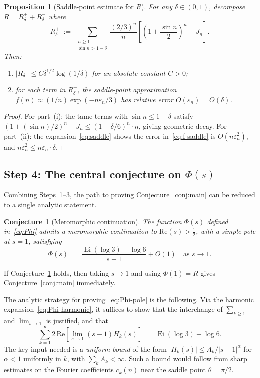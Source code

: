 \documentclass[12pt]{amsart}
\newtheorem{proposition}[theorem]{Proposition}
\newtheorem{conjecture}[theorem]{Conjecture}
\DeclareMathOperator{\Ei}{Ei}
\begin{document}
\begin{proposition}[Saddle-point estimate for $R$]\label{prop:saddle}
For any $\delta\in(0,1)$, decompose $R=R_\delta^{+}+R_\delta^{-}$
where
\[
  R_\delta^{+} \;:=\;
  \sum_{\substack{n\ge 1\\ \sin n>1-\delta}}
  \frac{(2/3)^n}{n}\!\left[\left(1+\frac{\sin n}{2}\right)^{\!n}-J_n\right].
\]
Then:
\begin{enumerate}[label=(\roman*)]
\item $|R_\delta^{-}|\le C\delta^{1/2}\log(1/\delta)$ for an absolute
  constant $C>0$;
\item for each term in $R_\delta^{+}$, the saddle-point approximation
  $f(n)\approx (1/n)\exp(-n\varepsilon_n/3)$ has relative error
  $O(\varepsilon_n)=O(\delta)$.
\end{enumerate}
\end{proposition}

\begin{proof}
For part~(i): the tame terms with $\sin n\le 1-\delta$ satisfy
$(1+(\sin n)/2)^n-J_n\le (1-\delta/6)^n\cdot n$, giving geometric
decay.  For part~(ii): the expansion~\eqref{eq:saddle} shows the
error in~\eqref{eq:f-saddle} is $O(n\varepsilon_n^2)$,
and $n\varepsilon_n^2\le n\varepsilon_n\cdot\delta$.
\end{proof}

\subsection{Step 4: The central conjecture on $\Phi(s)$}

Combining Steps~1--3, the path to proving Conjecture~\ref{conj:main}
can be reduced to a single analytic statement.

\begin{conjecture}[Meromorphic continuation]\label{conj:meromorphic}
The function $\Phi(s)$ defined in~\eqref{eq:Phi} admits a
meromorphic continuation to $\mathrm{Re}(s)>\tfrac{1}{2}$, with a
simple pole at $s=1$, satisfying
\begin{equation}\label{eq:Phi-pole}
  \Phi(s) \;=\; \frac{\Ei(\log 3)-\log 6}{s-1}
               + O(1) \quad\text{as } s\to 1.
\end{equation}
\end{conjecture}

\noindent
If Conjecture~\ref{conj:meromorphic} holds, then taking $s\to 1$
and using $\Phi(1)=R$ gives Conjecture~\ref{conj:main} immediately.

The analytic strategy for proving~\eqref{eq:Phi-pole} is the following.
Via the harmonic expansion~\eqref{eq:Phi-harmonic}, it suffices to show
that the interchange of $\sum_{k\ge 1}$ and $\lim_{s\to 1}$ is
justified, and that
\begin{equation}\label{eq:residue-sum}
  \sum_{k=1}^{\infty} 2\,\mathrm{Re}\!\left[
  \lim_{s\to 1}(s-1)H_k(s)\right]
  \;=\; \Ei(\log 3)-\log 6.
\end{equation}
The key input needed is a \emph{uniform bound} of the form
$|H_k(s)|\le A_k/|s-1|^{\alpha}$ for $\alpha<1$ uniformly in
$k$, with $\sum_k A_k<\infty$.  Such a bound would follow from
sharp estimates on the Fourier coefficients $c_k(n)$ near the
saddle point $\theta=\pi/2$.
\end{document}
